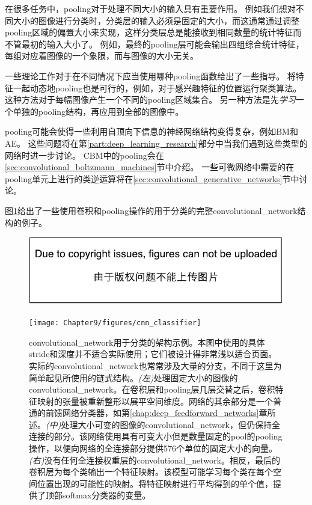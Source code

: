  
在很多任务中，\gls{pooling}对于处理不同大小的输入具有重要作用。
例如我们想对不同大小的图像进行分类时，分类层的输入必须是固定的大小，而这通常通过调整\gls{pooling}区域的偏置大小来实现，这样分类层总是能接收到相同数量的统计特征而不管最初的输入大小了。
例如，最终的\gls{pooling}层可能会输出四组综合统计特征，每组对应着图像的一个象限，而与图像的大小无关。

一些理论工作对于在不同情况下应当使用哪种\gls{pooling}函数给出了一些指导\citep{boureau-icml-10}。
将特征一起动态地\gls{pooling}也是可行的，例如，对于感兴趣特征的位置运行聚类算法\citep{boureau-iccv-11}。
这种方法对于每幅图像产生一个不同的\gls{pooling}区域集合。
另一种方法是先\emph{学习}一个单独的\gls{pooling}结构，再应用到全部的图像中\citep{jia2012beyond}。

\gls{pooling}可能会使得一些利用自顶向下信息的神经网络结构变得复杂，例如\gls{BM}和\gls{AE}。
这些问题将在第\ref{part:deep_learning_research}部分中当我们遇到这些类型的网络时进一步讨论。
\gls{CBM}中的\gls{pooling}会在\ref{sec:convolutional_boltzmann_machines}节中介绍。
一些可微网络中需要的在\gls{pooling}单元上进行的类逆运算将在\ref{sec:convolutional_generative_networks}节中讨论。

图\ref{fig:chap9_cnn_classifier}给出了一些使用卷积和\gls{pooling}操作的用于分类的完整\gls{convolutional_network}结构的例子。
\begin{figure}[!htb]
\ifOpenSource
\centerline{\includegraphics{figure.pdf}}
\else
\centerline{\texttt{[image: Chapter9/figures/cnn\_classifier]}}
\fi
\caption{\gls{convolutional_network}用于分类的架构示例。本图中使用的具体\gls{stride}和深度并不适合实际使用；它们被设计得非常浅以适合页面。实际的\gls{convolutional_network}也常常涉及大量的分支，不同于这里为简单起见所使用的链式结构。\emph{(左)}处理固定大小的图像的\gls{convolutional_network}。在卷积层和\gls{pooling}层几层交替之后，卷积特征映射的张量被重新整形以展平空间维度。网络的其余部分是一个普通的前馈网络分类器，如第\ref{chap:deep_feedforward_networks}章所述。\emph{(中)}处理大小可变的图像的\gls{convolutional_network}，但仍保持全连接的部分。该网络使用具有可变大小但是数量固定的\gls{pool}的\gls{pooling}操作，以便向网络的全连接部分提供576个单位的固定大小的向量。 \emph{(右)}没有任何全连接权重层的\gls{convolutional_network}。相反，最后的卷积层为每个类输出一个特征映射。该模型可能学习每个类在每个空间位置出现的可能性的映射。将特征映射进行平均得到的单个值，提供了顶部softmax分类器的变量。}
\label{fig:chap9_cnn_classifier}
\end{figure}


